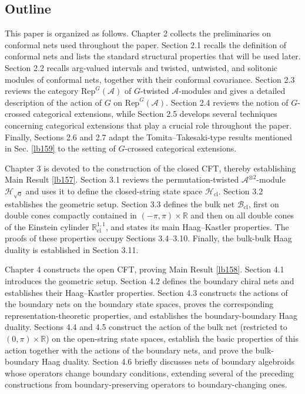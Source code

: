 \documentclass[11pt,b5paper,notitlepage]{article}
\theoremstyle{definition}
\theoremstyle{plain}
\newcommand{\RepGA}{\mathrm{Rep}^G(\mathcal A)}
\newcommand{\Rbb}{\mathbb R}
\newcommand{\MA}{\mathcal A}
\newcommand{\MH}{\mathcal H}
\newcommand{\Maa}{{\mathcal A^{\otimes 2}}}
\newcommand{\sqz}{{\sqrt 0}}
\newcommand{\Rcl}{\mathbb R^{1,1}_{\mathrm{cl}}}
\newcommand{\Bcl}{\mathcal B_{\mathrm{cl}}}
\newcommand{\Hcl}{\mathcal H_{\mathrm{cl}}}
\numberwithin{equation}{section}
\begin{document}
\subsection{Outline}

This paper is organized as follows. Chapter 2 collects the preliminaries on conformal nets used throughout the paper. Section 2.1 recalls the definition of conformal nets and lists the standard structural properties that will be used later. Section 2.2 recalls arg-valued intervals and twisted, untwisted, and solitonic modules of conformal nets, together with their conformal covariance. Section 2.3 reviews the category $\RepGA$ of $G$-twisted $\MA$-modules and gives a detailed description of the action of $G$ on $\RepGA$. Section 2.4 reviews the notion of $G$-crossed categorical extensions, while Section 2.5 develops several techniques concerning categorical extensions that play a crucial role throughout the paper. Finally, Sections 2.6 and 2.7 adapt the Tomita--Takesaki-type results mentioned in Sec. \ref{lb159} to the setting of $G$-crossed categorical extensions.


Chapter 3 is devoted to the construction of the closed CFT, thereby establishing Main Result \ref{lb157}. Section 3.1 reviews the permutation-twisted $\Maa$-module $\MH_\sqz$ and uses it to define the closed-string state space $\Hcl$. Section 3.2 establishes the geometric setup. Section 3.3 defines the bulk net $\Bcl$, first on double cones compactly contained in $(-\pi,\pi)\times\Rbb$ and then on all double cones of the Einstein cylinder $\Rcl$, and states its main Haag--Kastler properties. The proofs of these properties occupy Sections 3.4--3.10. Finally, the bulk-bulk Haag duality is established in Section 3.11.



Chapter 4 constructs the open CFT, proving Main Result \ref{lb158}. Section 4.1 introduces the geometric setup. Section 4.2 defines the boundary chiral nets and establishes their Haag--Kastler properties. Section 4.3 constructs the actions of the boundary nets on the boundary state spaces, proves the corresponding representation-theoretic properties, and establishes the boundary-boundary Haag duality. Sections 4.4 and 4.5 construct the action of the bulk net (restricted to $(0,\pi)\times\Rbb$) on the open-string state spaces, establish the basic properties of this action together with the actions of the boundary nets, and prove the bulk-boundary Haag duality. Section 4.6 briefly discusses nets of boundary algebroids whose operators change boundary conditions, extending several of the preceding constructions from boundary-preserving operators to boundary-changing ones.
\end{document}
